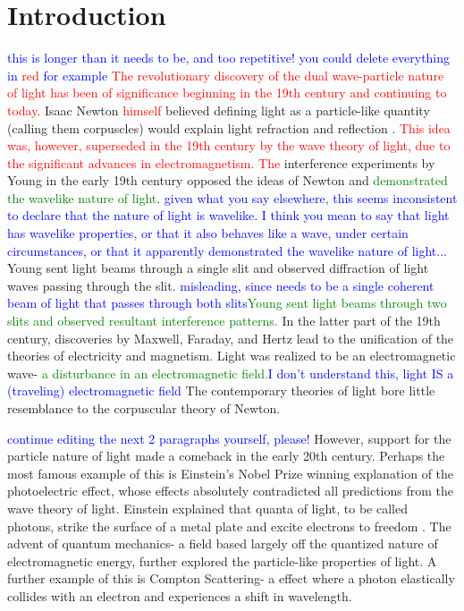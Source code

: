 \documentclass[prb,preprint]{revtex4-1}
\begin{document}
\section{Introduction} %

\textcolor{blue}{this is longer than it needs to be, and too repetitive!} \textcolor{blue}{you could delete everything in} \textcolor{red}{red} \textcolor{blue}{for example} \textcolor{red}{The revolutionary discovery of the dual wave-particle nature of light has been of significance beginning in the 19th century and continuing to today. } Isaac Newton \textcolor{red}{himself} believed defining light as a particle-like quantity (calling them corpuscles) would explain light refraction and reflection \cite{newton}.  \textcolor{red}{This idea was, however, superseded in the 19th century by the wave theory of light, due to the significant advances in electromagnetism.  The } interference experiments by Young in the early 19th century opposed the ideas of Newton and \textcolor{green}{demonstrated the wavelike nature of light}. \textcolor{blue}{given what you say elsewhere, this seems inconsistent to declare that the nature of light is wavelike. I think you mean to say that light has wavelike properties, or that it also behaves like a wave, under certain circumstances, or that it apparently demonstrated the wavelike nature of light...}   Young sent light beams through a single slit and observed diffraction of light waves passing through the slit.  \textcolor{blue}{misleading, since needs to be a single coherent beam of light that passes through both slits}\textcolor{green}{Young sent light beams through two slits and observed resultant interference patterns.}  In the latter part of the 19th century, discoveries by Maxwell, Faraday, and Hertz lead to the unification of the theories of electricity and magnetism.  Light was realized to be an electromagnetic wave- \textcolor{green}{a disturbance in an electromagnetic field.}\textcolor{blue}{I don't understand this, light IS a (traveling) electromagnetic field}  The contemporary theories of light bore little resemblance to the corpuscular theory of Newton.  \cite{david}

\textcolor{blue}{continue editing the next 2 paragraphs yourself, please!} 
However, support for the particle nature of light made a comeback in the early 20th century.  Perhaps the most famous example of this is Einstein's Nobel Prize winning explanation of the photoelectric effect, whose effects absolutely contradicted all predictions from the wave theory of light.  Einstein explained that quanta of light, to be called photons, strike the surface of a metal plate and excite electrons to freedom \cite{modern}.  The advent of quantum mechanics- a field based largely off the quantized nature of electromagnetic energy, further explored the particle-like properties of light.  A further example of this is Compton Scattering- a effect where a photon elastically collides with an electron and experiences a shift in wavelength.  
\end{document}
